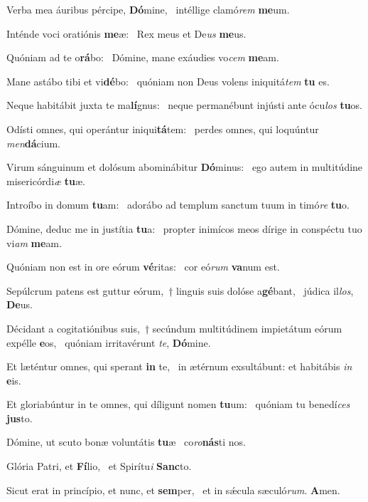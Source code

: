\item Verba mea áuribus pércipe, \textbf{Dó}mine,~\psstar{} intéllige clamó\textit{rem} \textbf{me}um.
\item Inténde voci oratiónis \textbf{me}æ:~\psstar{} Rex meus et De\textit{us} \textbf{me}us.
\item Quóniam ad te o\textbf{rá}bo:~\psstar{} Dómine, mane exáudies vo\textit{cem} \textbf{me}am.
\item Mane astábo tibi et vi\textbf{dé}bo:~\psstar{} quóniam non Deus volens iniquitá\textit{tem} \textbf{tu} es.
\item Neque habitábit juxta te ma\textbf{lí}gnus:~\psstar{} neque permanébunt injústi ante ócu\textit{los} \textbf{tu}os.
\item Odísti omnes, qui operántur iniqui\textbf{tá}tem:~\psstar{} perdes omnes, qui loquúntur \textit{men}\textbf{dá}cium.
\item Virum sánguinum et dolósum abominábitur \textbf{Dó}minus:~\psstar{} ego autem in multitúdine misericórdi\textit{æ} \textbf{tu}æ.
\item Introíbo in domum \textbf{tu}am:~\psstar{} adorábo ad templum sanctum tuum in timó\textit{re} \textbf{tu}o.
\item Dómine, deduc me in justítia \textbf{tu}a:~\psstar{} propter inimícos meos dírige in conspéctu tuo vi\textit{am} \textbf{me}am.
\item Quóniam non est in ore eórum \textbf{vé}ritas:~\psstar{} cor eó\textit{rum} \textbf{va}num est.
\item Sepúlcrum patens est guttur eórum,~† linguis suis dolóse a\textbf{gé}bant,~\psstar{} júdica il\textit{los}, \textbf{De}us.
\item Décidant a cogitatiónibus suis,~† secúndum multitúdinem impietátum eórum expélle \textbf{e}os,~\psstar{} quóniam irritavérunt \textit{te}, \textbf{Dó}mine.
\item Et læténtur omnes, qui sperant \textbf{in} te,~\psstar{} in ætérnum exsultábunt: et habitábis \textit{in} \textbf{e}is.
\item Et gloriabúntur in te omnes, qui díligunt nomen \textbf{tu}um:~\psstar{} quóniam tu benedí\textit{ces} \textbf{jus}to.
\item Dómine, ut scuto bonæ voluntátis \textbf{tu}æ~\psstar{} co\textit{ro}\textbf{nás}ti nos.
\item Glória Patri, et \textbf{Fí}lio,~\psstar{} et Spirítu\textit{i} \textbf{Sanc}to.
\item Sicut erat in princípio, et nunc, et \textbf{sem}per,~\psstar{} et in sǽcula sæculó\textit{rum}. \textbf{A}men.
